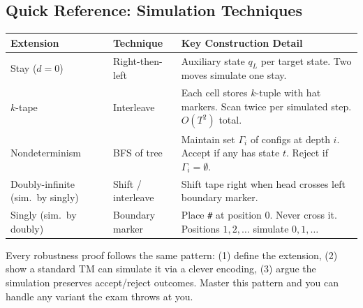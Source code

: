 \documentclass[11pt,a4paper]{article}
\newcommand{\kt}[1]{\par\vspace{0.3em}\colorbox{yellow!60}{\parbox{\dimexpr\linewidth-2\fboxsep}{#1}}\vspace{0.3em}}
\begin{document}
\subsection{Quick Reference: Simulation Techniques}

\begin{center}
\begin{tabular}{p{2.8cm}p{2.8cm}p{6cm}}
\toprule
\textbf{Extension} & \textbf{Technique} & \textbf{Key Construction Detail} \\
\midrule
Stay ($d=0$) & Right-then-left & Auxiliary state $q_L$ per target state. Two moves simulate one stay. \\[0.3em]
$k$-tape & Interleave & Each cell stores $k$-tuple with hat markers. Scan twice per simulated step. $O(T^2)$ total. \\[0.3em]
Nondeterminism & BFS of tree & Maintain set $\Gamma_i$ of configs at depth $i$. Accept if any has state $t$. Reject if $\Gamma_i = \emptyset$. \\[0.3em]
Doubly-infinite (sim.\ by singly) & Shift / interleave & Shift tape right when head crosses left boundary marker. \\[0.3em]
Singly (sim.\ by doubly) & Boundary marker & Place \texttt{\#} at position 0. Never cross it. Positions $1, 2, \ldots$ simulate $0, 1, \ldots$ \\
\bottomrule
\end{tabular}
\end{center}

\kt{Every robustness proof follows the same pattern: (1) define the extension, (2) show a standard TM can simulate it via a clever encoding, (3) argue the simulation preserves accept/reject outcomes. Master this pattern and you can handle any variant the exam throws at you.}
\end{document}
